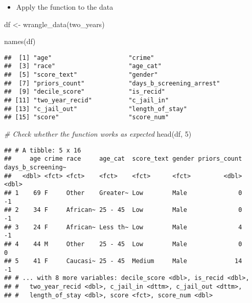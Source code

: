\documentclass[
]{book}
\newenvironment{Shaded}{\begin{snugshade}}{\end{snugshade}}
\newcommand{\CommentTok}[1]{\textcolor[rgb]{0.56,0.35,0.01}{\textit{#1}}}
\newcommand{\DecValTok}[1]{\textcolor[rgb]{0.00,0.00,0.81}{#1}}
\newcommand{\FunctionTok}[1]{\textcolor[rgb]{0.00,0.00,0.00}{#1}}
\newcommand{\NormalTok}[1]{#1}
\newcommand{\OtherTok}[1]{\textcolor[rgb]{0.56,0.35,0.01}{#1}}
\providecommand{\tightlist}{%
  \setlength{\itemsep}{0pt}\setlength{\parskip}{0pt}}
\begin{document}
\begin{itemize}
\tightlist
\item
  Apply the function to the data
\end{itemize}

\begin{Shaded}
\begin{Highlighting}[]
\NormalTok{df }\OtherTok{\textless{}{-}} \FunctionTok{wrangle\_data}\NormalTok{(two\_years)}

\FunctionTok{names}\NormalTok{(df)}
\end{Highlighting}
\end{Shaded}

\begin{verbatim}
##  [1] "age"                     "crime"                  
##  [3] "race"                    "age_cat"                
##  [5] "score_text"              "gender"                 
##  [7] "priors_count"            "days_b_screening_arrest"
##  [9] "decile_score"            "is_recid"               
## [11] "two_year_recid"          "c_jail_in"              
## [13] "c_jail_out"              "length_of_stay"         
## [15] "score"                   "score_num"
\end{verbatim}

\begin{Shaded}
\begin{Highlighting}[]
\CommentTok{\# Check whether the function works as expected}
\FunctionTok{head}\NormalTok{(df, }\DecValTok{5}\NormalTok{)}
\end{Highlighting}
\end{Shaded}

\begin{verbatim}
## # A tibble: 5 x 16
##     age crime race     age_cat  score_text gender priors_count days_b_screening~
##   <dbl> <fct> <fct>    <fct>    <fct>      <fct>         <dbl>             <dbl>
## 1    69 F     Other    Greater~ Low        Male              0                -1
## 2    34 F     African~ 25 - 45  Low        Male              0                -1
## 3    24 F     African~ Less th~ Low        Male              4                -1
## 4    44 M     Other    25 - 45  Low        Male              0                 0
## 5    41 F     Caucasi~ 25 - 45  Medium     Male             14                -1
## # ... with 8 more variables: decile_score <dbl>, is_recid <dbl>,
## #   two_year_recid <dbl>, c_jail_in <dttm>, c_jail_out <dttm>,
## #   length_of_stay <dbl>, score <fct>, score_num <dbl>
\end{verbatim}
\end{document}
